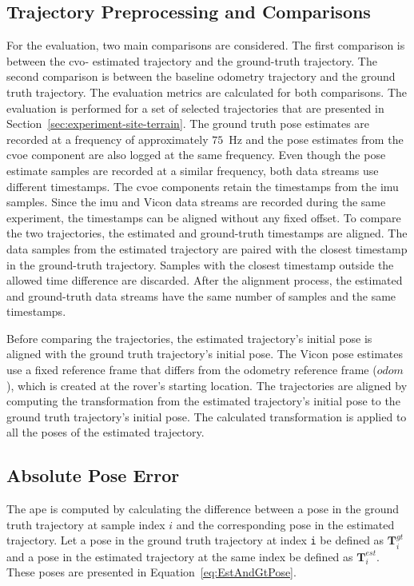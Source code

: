 \documentclass[report.tex]{subfiles}
\begin{document}
    \subsection{Trajectory Preprocessing and Comparisons}
    
    For the evaluation, two main comparisons are considered. The first comparison is between the \gls{cvo}- estimated trajectory and the ground-truth trajectory. The second comparison is between the baseline odometry trajectory and the ground truth trajectory. The evaluation metrics are calculated for both comparisons. The evaluation is performed for a set of selected trajectories that are presented in Section~\ref{sec:experiment-site-terrain}. The ground truth pose estimates are recorded at a frequency of approximately $75$~Hz and the pose estimates from the \gls{cvoe} component are also logged at the same frequency. Even though the pose estimate samples are recorded at a similar frequency, both data streams use different timestamps. The \gls{cvoe} components retain the timestamps from the \gls{imu} samples. Since the \gls{imu} and Vicon data streams are recorded during the same experiment, the timestamps can be aligned without any fixed offset. To compare the two trajectories, the estimated and ground-truth timestamps are aligned. The data samples from the estimated trajectory are paired with the closest timestamp in the ground-truth trajectory. Samples with the closest timestamp outside the allowed time difference are discarded. After the alignment process, the estimated and ground-truth data streams have the same number of samples and the same timestamps. 
        
    Before comparing the trajectories, the estimated trajectory's initial pose is aligned with the ground truth trajectory's initial pose. The Vicon pose estimates use a fixed reference frame that differs from the odometry reference frame ($odom$), which is created at the rover's starting location. The trajectories are aligned by computing the transformation from the estimated trajectory's initial pose to the ground truth trajectory's initial pose. The calculated transformation is applied to all the poses of the estimated trajectory.   
    
    \subsection{Absolute Pose Error} 
        
    The \gls{ape} is computed by calculating the difference between a pose in the ground truth trajectory at sample index $i$ and the corresponding pose in the estimated trajectory. Let a pose in the ground truth trajectory at index \texttt{i} be defined as $\mathbf{T}^{gt}_i$ and a pose in the estimated trajectory at the same index be defined as $\mathbf{T}^{est}_i$. These poses are presented in Equation~\ref{eq:EstAndGtPose}. 
\end{document}
